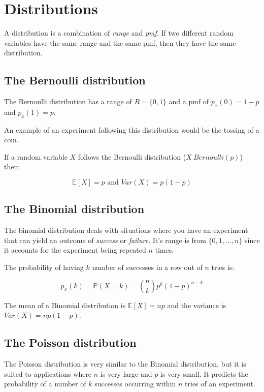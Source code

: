 \section{Distributions}

A distribution is a combination of {\it range} and {\it pmf}. If two different
random variables have the same range and the same pmf, then they have the same
distribution.

\subsection{The Bernoulli distribution}

The Bernoulli distribution has a range of $R = \{0, 1\}$ and a pmf of $p_x(0) =
1-p$ and $p_x(1) = p$.

An example of an experiment following this distribution would be the tossing of
a coin.

If a random variable $X$ follows the Bernoulli distribution ($X ~ Bernoulli(p)$)
then:

\begin{dmath*}
	{\mathbb{E}[X] = p} \textrm{ and } {Var(X) = p(1-p)}
\end{dmath*}

\subsection{The Binomial distribution}

The binomial distribution deals with situations where you have an experiment
that can yield an outcome of {\it success} or {\it failure}. It's range is from
$\{0, 1, \dots, n\}$ since it accounts for the experiment being repeated $n$
times.

The probability of having $k$ number of successes in a row out of $n$ tries is:

\begin{dmath*}
	{p_x(k) = \mathbb{P}(X = k) = {n \choose k}p^k(1-p)^{n-k}}
\end{dmath*}

The mean of a Binomial distribution is $\mathbb{E}[X] = np$ and the variance is
$Var(X) = np(1-p)$.

\subsection{The Poisson distribution}

The Poisson distribution is very similar to the Binomial distribution, but it is
suited to applications where $n$ is very large and $p$ is very small. It
predicts the probability of a number of $k$ successes occurring within $n$ tries
of an experiment.


